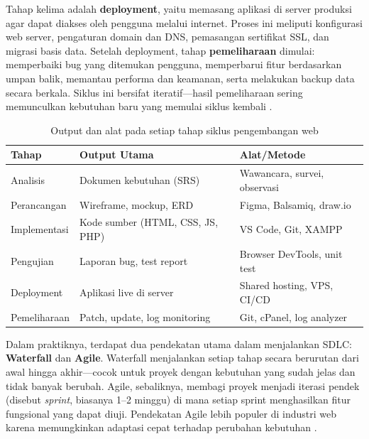 Tahap kelima adalah \textbf{deployment}, yaitu memasang aplikasi di server produksi agar dapat diakses oleh pengguna melalui internet. Proses ini meliputi konfigurasi web server, pengaturan domain dan DNS, pemasangan sertifikat SSL, dan migrasi basis data. Setelah deployment, tahap \textbf{pemeliharaan} dimulai: memperbaiki bug yang ditemukan pengguna, memperbarui fitur berdasarkan umpan balik, memantau performa dan keamanan, serta melakukan backup data secara berkala. Siklus ini bersifat iteratif---hasil pemeliharaan sering memunculkan kebutuhan baru yang memulai siklus kembali \cite{mdnDeploy}.

\begin{table}[htbp]
\centering
\begin{tabular}{|P{2.5cm}|P{4cm}|P{5cm}|}
\hline
\textbf{Tahap} & \textbf{Output Utama} & \textbf{Alat/Metode} \\
\hline
Analisis & Dokumen kebutuhan (SRS) & Wawancara, survei, observasi \\
\hline
Perancangan & Wireframe, mockup, ERD & Figma, Balsamiq, draw.io \\
\hline
Implementasi & Kode sumber (HTML, CSS, JS, PHP) & VS Code, Git, XAMPP \\
\hline
Pengujian & Laporan bug, test report & Browser DevTools, unit test \\
\hline
Deployment & Aplikasi live di server & Shared hosting, VPS, CI/CD \\
\hline
Pemeliharaan & Patch, update, log monitoring & Git, cPanel, log analyzer \\
\hline
\end{tabular}
\caption{Output dan alat pada setiap tahap siklus pengembangan web}
\end{table}

Dalam praktiknya, terdapat dua pendekatan utama dalam menjalankan SDLC: \textbf{Waterfall} dan \textbf{Agile}. Waterfall menjalankan setiap tahap secara berurutan dari awal hingga akhir---cocok untuk proyek dengan kebutuhan yang sudah jelas dan tidak banyak berubah. Agile, sebaliknya, membagi proyek menjadi iterasi pendek (disebut \textit{sprint}, biasanya 1--2 minggu) di mana setiap sprint menghasilkan fitur fungsional yang dapat diuji. Pendekatan Agile lebih populer di industri web karena memungkinkan adaptasi cepat terhadap perubahan kebutuhan \cite{mdnLearn}.

